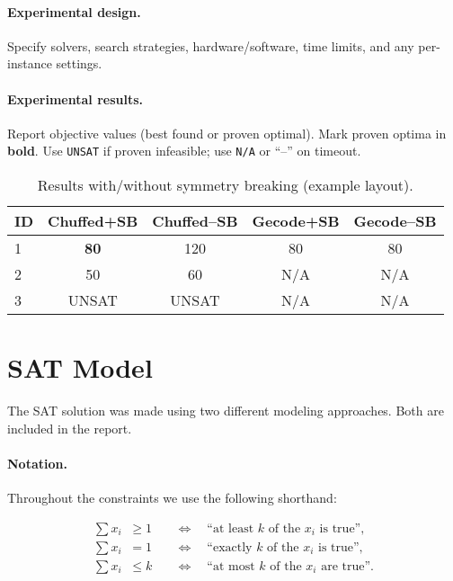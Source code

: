 \documentclass{article}
\begin{document}
\paragraph{Experimental design.}
Specify solvers, search strategies, hardware/software, time limits, and any per-instance settings.

\paragraph{Experimental results.}
Report objective values (best found or proven optimal).
Mark proven optima in \textbf{bold}. Use \texttt{UNSAT} if proven infeasible; use \texttt{N/A} or ``--'' on timeout.

\begin{table}[h]
\centering
\caption{Results with/without symmetry breaking (example layout).}
\label{tab:cp}
\begin{tabular}{lcccc}
\toprule
\textbf{ID} & \textbf{Chuffed+SB} & \textbf{Chuffed--SB} & \textbf{Gecode+SB} & \textbf{Gecode--SB}\\
\midrule
1 & \textbf{80} & 120 & 80 & 80 \\
2 & 50 & 60 & N/A & N/A \\
3 & UNSAT & UNSAT & N/A & N/A \\
\bottomrule
\end{tabular}
\end{table}

\section{SAT Model}

The SAT solution was made using two different modeling approaches. Both are included in the report. 

\paragraph{Notation.}
Throughout the constraints we use the following shorthand:

\[
\begin{aligned}
\sum x_i \;\;\geq 1 &\quad\Longleftrightarrow\quad \text{``at least $k$ of the $x_i$ is true''}, \\[6pt]
\sum x_i \;\;= 1   &\quad\Longleftrightarrow\quad \text{``exactly $k$ of the $x_i$ is true''}, \\[6pt]
\sum x_i \;\;\leq k &\quad\Longleftrightarrow\quad \text{``at most $k$ of the $x_i$ are true''}.
\end{aligned}
\]
\end{document}
